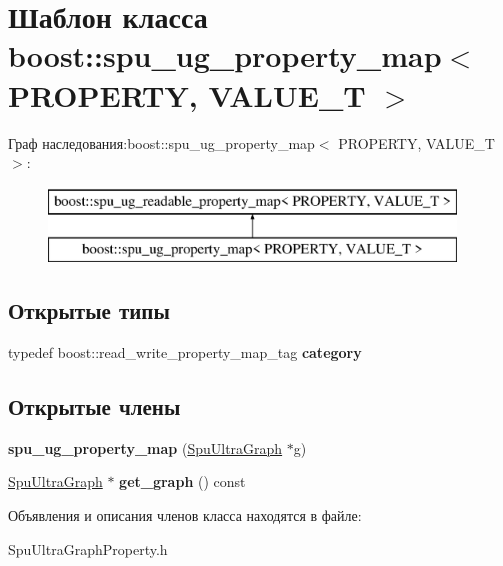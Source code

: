 \hypertarget{classboost_1_1spu__ug__property__map}{}\section{Шаблон класса boost\+:\+:spu\+\_\+ug\+\_\+property\+\_\+map$<$ P\+R\+O\+P\+E\+R\+TY, V\+A\+L\+U\+E\+\_\+T $>$}
\label{classboost_1_1spu__ug__property__map}
Граф наследования\+:boost\+:\+:spu\+\_\+ug\+\_\+property\+\_\+map$<$ P\+R\+O\+P\+E\+R\+TY, V\+A\+L\+U\+E\+\_\+T $>$\+:\begin{figure}[H]
\begin{center}
\leavevmode
\includegraphics[height=2.000000cm]{classboost_1_1spu__ug__property__map}
\end{center}
\end{figure}
\subsection*{Открытые типы}
\begin{DoxyCompactItemize}
\item 
\mbox{\label{classboost_1_1spu__ug__property__map_a40651558e7e4f89febe65f5b6eebcd19}} 
typedef boost\+::read\+\_\+write\+\_\+property\+\_\+map\+\_\+tag {\bfseries category}
\end{DoxyCompactItemize}
\subsection*{Открытые члены}
\begin{DoxyCompactItemize}
\item 
\mbox{\label{classboost_1_1spu__ug__property__map_a7820ea84ed846dabf4aecbb4d98eaf8a}} 
{\bfseries spu\+\_\+ug\+\_\+property\+\_\+map} (\hyperlink{class_s_p_u___g_r_a_p_h_1_1_spu_ultra_graph}{Spu\+Ultra\+Graph} $\ast$g)
\item 
\mbox{\label{classboost_1_1spu__ug__property__map_a90c5fe6f7dfbba7bd3d54cc2dcab9f37}} 
\hyperlink{class_s_p_u___g_r_a_p_h_1_1_spu_ultra_graph}{Spu\+Ultra\+Graph} $\ast$ {\bfseries get\+\_\+graph} () const
\end{DoxyCompactItemize}


Объявления и описания членов класса находятся в файле\+:\begin{DoxyCompactItemize}
\item 
Spu\+Ultra\+Graph\+Property.\+h\end{DoxyCompactItemize}
